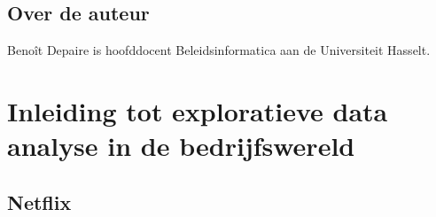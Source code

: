 \documentclass[]{memoir}
\begin{document}
\section*{Over de auteur}\label{over-de-auteur}

Benoît Depaire is hoofddocent Beleidsinformatica aan de Universiteit
Hasselt.

\chapter{Inleiding tot exploratieve data analyse in de
bedrijfswereld}\label{inleiding-tot-exploratieve-data-analyse-in-de-bedrijfswereld}

\section{Netflix}\label{netflix}
\end{document}

